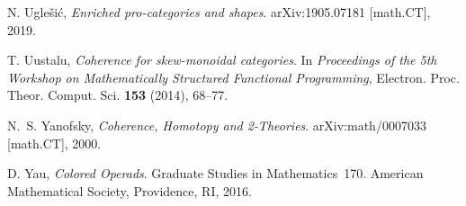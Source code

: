 \documentclass{tac}
\begin{document}
\begin{references*}
N. Ugle\v{s}i\'c,
\emph{Enriched pro-categories and shapes}.
arXiv:1905.07181 [math.CT], 2019.

T. Uustalu,
\emph{Coherence for skew-monoidal categories}.
In \emph{Proceedings of the 5th Workshop on Mathematically Structured Functional Programming},
Electron. Proc. Theor. Comput. Sci. \textbf{153} (2014), 68--77.

N.~S. Yanofsky,
\emph{Coherence, Homotopy and 2-Theories}.
arXiv:math/0007033 [math.CT], 2000.

D. Yau,
\emph{Colored Operads}.
Graduate Studies in Mathematics~170.
American Mathematical Society, Providence, RI, 2016.
\end{references*}
\end{document}
